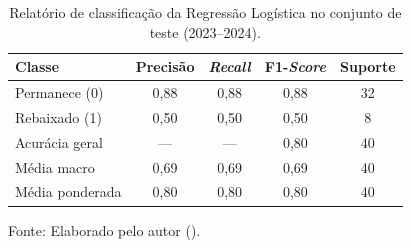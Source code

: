 \begin{table}[htbp]
    \centering
    \caption[Relatório de classificação da Regressão Logística]{Relatório de classificação da Regressão Logística no conjunto de teste (2023--2024).}
    \label{tab:classificacao}
    \begin{tabular}{lcccc}
        \toprule
        \textbf{Classe} & \textbf{Precisão} & \textbf{\textit{Recall}} & \textbf{F1-\textit{Score}} & \textbf{Suporte} \\
        \midrule
        Permanece (0)  & 0,88 & 0,88 & 0,88 & 32 \\
        Rebaixado (1)  & 0,50 & 0,50 & 0,50 & 8  \\
        \midrule
        Acurácia geral & ---  & ---  & 0,80 & 40 \\
        Média macro    & 0,69 & 0,69 & 0,69 & 40 \\
        Média ponderada & 0,80 & 0,80 & 0,80 & 40 \\
        \bottomrule
    \end{tabular}

    \vspace{2pt}
    {\small Fonte: Elaborado pelo autor (\the\year).}
\end{table}
